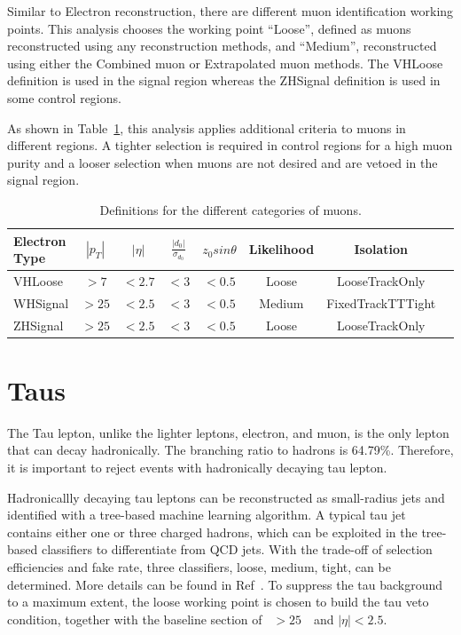\par Similar to Electron reconstruction, there are different muon identification working points. This analysis chooses the working point ``Loose'', defined as muons reconstructed using any reconstruction methods, and ``Medium'', reconstructed using either the Combined muon or Extrapolated muon methods. The VHLoose definition is used in the signal region whereas the ZHSignal definition is used in some control regions.                  
\par As shown in Table~\ref{tab:mu}, this analysis applies additional criteria to muons in different regions. A tighter selection is required in control regions for a high muon purity and a looser selection when muons are not desired and are vetoed in the signal region.
\begin{table}[tbh]
    \centering
    \begin{tabular}{|l|c|c|c|c|c|c|c}
        \hline
        Electron Type & $|p_T|$ &$|\eta|$ & $\frac{|d_0|}{\sigma_{d_0}}$&$z_0 sin\theta$ & Likelihood &Isolation \\
        \hline
        VHLoose &$>7$&$<2.7$&$<3$&$<0.5$&Loose&LooseTrackOnly\\
        \hline
        WHSignal &$>25$&$<2.5$&$<3$&$<0.5$&Medium&FixedTrackTTTight\\
        \hline
        ZHSignal &$>25$&$<2.5$&$<3$&$<0.5$&Loose&LooseTrackOnly\\
        \hline
    \end{tabular}
    \caption{Definitions for the different categories of muons.}
    \label{tab:mu}
\end{table}

\section{Taus}
\label{sec:taus}

\par The Tau lepton, unlike the lighter leptons, electron, and muon, 
is the only lepton that can decay hadronically. The branching ratio to hadrons is 64.79\%. Therefore, it is important to reject events with hadronically decaying tau lepton.

\par Hadronicallly decaying tau leptons can be reconstructed as small-radius jets and identified with a tree-based machine learning algorithm. A typical tau jet contains either one or three charged hadrons, which can be exploited in the tree-based classifiers to differentiate from QCD jets. With the trade-off of selection efficiencies and fake rate, three classifiers, loose, medium, tight, can be determined. More details can be found in Ref~\cite{ATL-PHYS-PUB-2015-045}. 
To suppress the tau background to a maximum extent, the loose working point is chosen to build the tau veto condition, together with the baseline section of \pt~$> 25$~\GeV~and $|\eta| < 2.5$.

